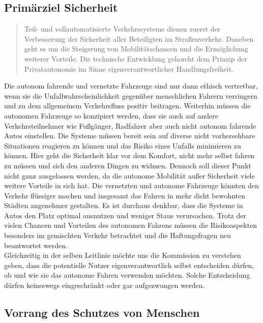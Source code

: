 \documentclass[twoside,a4paper,12pt]{article}
\begin{document}
\subsection{Primärziel Sicherheit} \label{PrimaerzielSicherheit}

\begin{quote}
\glqq
Teil- und vollautomatisierte Verkehrssysteme dienen zuerst der Verbesserung der Sicherheit aller Beteiligten im Straßenverkehr. 
Daneben geht es um die Steigerung von Mobilitätschancen und die Ermöglichung weiterer Vorteile. Die technische Entwicklung 
gehorcht dem Prinzip der Privatautonomie im Sinne eigenverantwortlicher Handlungsfreiheit.\grqq\mbox{~\cite[S. 10]{ek}}
\end{quote}
Die autonom fahrende und vernetzte Fahrzeuge sind nur dann ethisch vertretbar, wenn sie die Unfallwahrscheinlichkeit gegenüber menschlichen Fahrern verringern und zu dem allgemeinem Verkehrsfluss positiv beitragen. Weiterhin müssen die autonomen Fahrzeuge so konzipiert werden, dass sie auch auf andere Verkehrsteilnehmer wie Fußgänger, Radfahrer aber auch nicht autonom fahrende Autos  einstellen. Die Systeme müssen bereit sein auf diverse nicht vorhersehbare Situationen reagieren zu können und das Risiko eines Unfalls minimieren zu können. Hier geht die Sicherheit klar vor dem Komfort, nicht mehr selbst fahren zu müssen und sich den anderen Dingen zu widmen. Dennoch soll dieser Punkt nicht ganz ausgelassen werden, da die autonome Mobilität außer Sicherheit viele weitere Vorteile in sich hat. Die vernetzten und autonome Fahrzeuge könnten den Verkehr flüssiger machen und insgesamt das Fahren in mehr dicht bewohnten Städten angenehmer gestalten. Es ist durchaus denkbar, dass die Systeme in Autos den Platz optimal ausnutzen und weniger Staus verursachen. Trotz der vielen Chancen und Vorteilen des autonomen Fahrens müssen die Risikoaspekten besonders im gemischten Verkehr betrachtet  und die Haftungsfragen neu beantwortet werden. \\  Gleichzeitig in der selben Leitlinie möchte uns die Kommission zu verstehen geben, dass die potentielle Nutzer eigenverantwortlich selbst entscheiden dürfen, ob und wie sie das autonome Fahren verwenden möchten. Solche Entscheidung dürfen keineswegs eingeschränkt oder gar aufgezwungen werden.
\newpage
\subsection{Vorrang des Schutzes von Menschen} \label{VorrangDesSchutzesVonMenschen}
\end{document}
